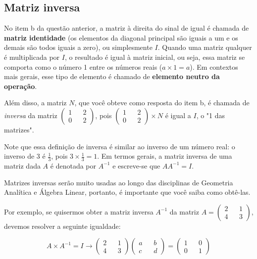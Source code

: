\documentclass[main_estudante.tex]{subfiles}
\begin{document}
\subsection*{Matriz inversa}

No item b da questão anterior, a matriz à direita do sinal de igual é chamada de \textbf{matriz identidade} (os elementos da diagonal principal são iguais a um e os demais são todos iguais a zero), ou simplesmente $I$. Quando uma matriz qualquer é multiplicada por $I$, o resultado é igual à matriz inicial, ou seja, essa matriz se comporta como o número 1 entre os números reais ($a \times 1 = a$). Em contextos mais gerais, esse tipo de elemento é chamado de \textbf{elemento neutro da operação}.

Além disso, a matriz $N$, que você obteve como resposta do item b, é chamada de {\em inversa} da matriz $ \begin{pmatrix} 1 && 2 \\ 0 && 2 \end{pmatrix}$, pois $\begin{pmatrix} 1 && 2 \\ 0 && 2 \end{pmatrix} \times N$ é igual a $I$, o "1 das matrizes".

Note que essa definição de inversa é similar ao inverso de um número real: o inverso de 3 é $\frac{1}{3}$, pois $3 \times \frac{1}{3} = 1$. Em termos gerais, a matriz inversa de uma matriz dada $A$ é denotada por $A^{-1}$ e escreve-se que $AA^{-1}=I$.

Matrizes inversas serão muito usadas ao longo das disciplinas de Geometria Analítica e Álgebra Linear, portanto, é importante que você saiba como obtê-las.

Por exemplo, se quisermos obter a matriz inversa $A^{-1}$ da matriz $A=\begin{pmatrix} 2 && 1 \\ 4 && 3 \end{pmatrix}$, devemos resolver a seguinte igualdade:


\begin{equation*}
 A \times A^{-1}=I \longrightarrow \begin{pmatrix} 2 && 1 \\ 4 && 3 \end{pmatrix} \begin{pmatrix} a && b \\ c && d \end{pmatrix} = \begin{pmatrix} 1 && 0 \\ 0 && 1 \end{pmatrix}
\end{equation*}
\end{document}
